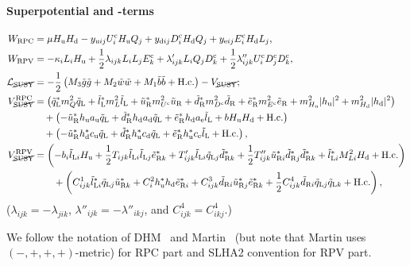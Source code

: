 \documentclass[CheatSheet]{subfiles}
\begin{document}
\paragraph{Superpotential and -terms}
\begin{align}
 W\w{RPC} &= \mu\Hu\Hd
           - \yu[ij] U^\cc_i\Hu Q_j
           + \yd[ij] D^\cc_i\Hd Q_j
           + \ye[ij] E^\cc_i\Hd L_j,\\
 W\w{RPV} &= -\kappa_i L_i\Hu 
           + \frac12 \lambda  _{ijk} L_i L_j E^\cc_k
           +         \lambda' _{ijk} L_i Q_j D^\cc_k
           + \frac12 \lambda''_{ijk} U^\cc_i D^\cc_j D^\cc_k,
\\
\mathcal L_{\text{\cancel{SUSY}}}&=
- \frac12\left(M_3\tig\tig+M_2\tiw\tiw+M_1\tib\tib+\text{H.c.}\right)
-V_{\text{\cancel{SUSY}}};\\
V^{\mathrm{RPC}}_{\text{\cancel{SUSY}}}&=
\left(\tqL^*m_Q^2\tqL+\tlL^*m_L^2\tlL+\tuR^* m_{U^\cc}^2\tuR + \tdR^* m_{D^\cc}^2\tdR + \teR^* m_{E^\cc}^2\teR
       +m^2_{\Hu}|\hu|^2 + m^2_{\Hd}|\hd|^2\right)
\notag\\&\quad
       +\left(-\tuR^*\hu {a\w u}\tqL + \tdR^* \hd {a\w d} \tqL+ \teR^* \hd {a\w e} \tlL + b\Hu\Hd+\text{H.c.}\right)
\notag\\&\quad
       +\left(-\tuR^*\hd^*{c\w u}\tqL+\tdR^* \hu^*{c\w d}\tqL+\teR^*\hu^*{c\w e}\tlL+\text{H.c.}\right),
\\
V^{\mathrm{RPV}}_{\text{\cancel{SUSY}}}&=
    \left(-b_i\tlL[i]\Hu +\frac12T_{ijk}\tlL[i]\tlL[j]\teR[k]^*+T'_{ijk}\tlL[i]\tqL[j]\tdR[k]^*
             +\frac12T''_{ijk}\tuR[i]^*\tdR[j]^*\tdR[k]^*
    +\tlL[i]^*M^2_{Li}\Hd+\text{H.c.}\right)
\notag\\&\qquad
   + \left(C^1_{ijk}\tlL[i]^*\tqL[j]\tuR[k]^* + C^2_i\hu^*\hd\teR[i]^* + C^3_{ijk}\tdR[i]\tuR[j]^*\teR[k]^*+\frac12C^4_{ijk}\tdR[i]\tqL[j]\tqL[k]+\text{H.c.}\right),
\end{align}
($\lambda_{ijk}=-\lambda_{jik}$, $\lambda''_{ijk}=-\lambda''_{ikj}$, and 
$C^4_{ijk}=C^4_{ikj}$.)



\clearpage

\detailstyle

We follow the notation of DHM~\cite[PhysRept]{0812.1594} and Martin~\cite[v7]{hep-ph9709356} (but note that Martin uses $(-,+,+,+)$-metric) for RPC part and SLHA2 convention for RPV part.
\end{document}
